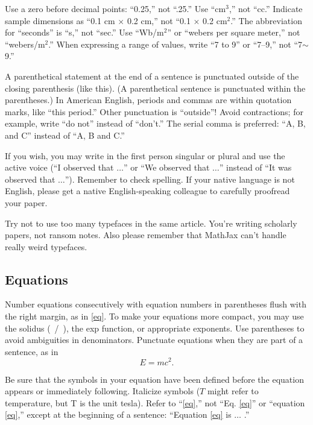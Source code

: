 \documentclass{ieeeaccess}
\begin{document}
Use a zero before decimal points: ``0.25,'' not ``.25.'' Use 
``cm$^{3}$,'' not ``cc.'' Indicate sample dimensions as ``0.1 cm 
$\times $ 0.2 cm,'' not ``0.1 $\times $ 0.2 cm$^{2}$.'' The 
abbreviation for ``seconds'' is ``s,'' not ``sec.'' Use 
``Wb/m$^{2}$'' or ``webers per square meter,'' not 
``webers/m$^{2}$.'' When expressing a range of values, write ``7 to 
9'' or ``7--9,'' not ``7$\sim $9.''

A parenthetical statement at the end of a sentence is punctuated outside of 
the closing parenthesis (like this). (A parenthetical sentence is punctuated 
within the parentheses.) In American English, periods and commas are within 
quotation marks, like ``this period.'' Other punctuation is ``outside''! 
Avoid contractions; for example, write ``do not'' instead of ``don't.'' The 
serial comma is preferred: ``A, B, and C'' instead of ``A, B and C.''

If you wish, you may write in the first person singular or plural and use 
the active voice (``I observed that $\ldots$'' or ``We observed that $\ldots$'' 
instead of ``It was observed that $\ldots$''). Remember to check spelling. If 
your native language is not English, please get a native English-speaking 
colleague to carefully proofread your paper.

Try not to use too many typefaces in the same article. You're writing
scholarly papers, not ransom notes. Also please remember that MathJax
can't handle really weird typefaces.

\subsection{Equations}
Number equations consecutively with equation numbers in parentheses flush 
with the right margin, as in \eqref{eq}. To make your equations more 
compact, you may use the solidus (~/~), the exp function, or appropriate 
exponents. Use parentheses to avoid ambiguities in denominators. Punctuate 
equations when they are part of a sentence, as in
\begin{equation}E=mc^2.\label{eq}\end{equation}

Be sure that the symbols in your equation have been defined before the 
equation appears or immediately following. Italicize symbols ($T$ might refer 
to temperature, but T is the unit tesla). Refer to ``\eqref{eq},'' not ``Eq. \eqref{eq}'' 
or ``equation \eqref{eq},'' except at the beginning of a sentence: ``Equation \eqref{eq} 
is $\ldots$ .''
\end{document}
